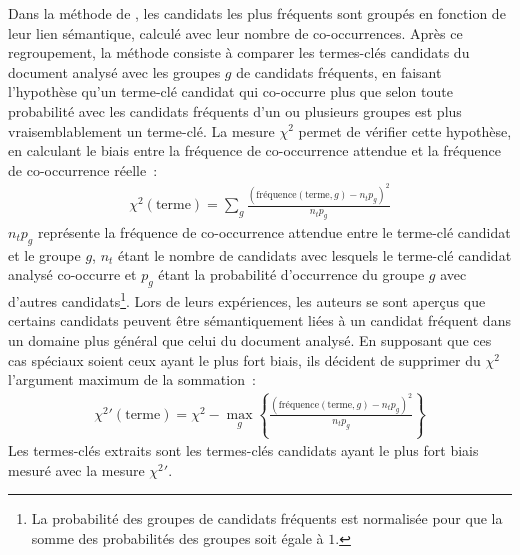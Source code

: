           Dans la méthode de , les candidats
          les plus fréquents sont groupés en fonction de leur lien sémantique,
          calculé avec leur nombre de co-occurrences. Après ce regroupement, la
          méthode consiste à comparer les termes-clés candidats du document
          analysé avec les groupes $g$ de candidats fréquents, en faisant
          l'hypothèse qu'un terme-clé candidat qui co-occurre plus que selon
          toute probabilité avec les candidats fréquents d'un ou plusieurs
          groupes est plus vraisemblablement un terme-clé. La mesure $\chi^2$
          permet de vérifier cette hypothèse, en calculant le biais entre la
          fréquence de co-occurrence attendue et la fréquence de co-occurrence
          réelle~:
          \begin{align}
            \chi^2(\text{terme}) = \sum_{g} \frac{(\text{fréquence}(\text{terme}, g) - n_tp_g)^2}{n_tp_g}
          \end{align}
          $n_tp_g$ représente la fréquence de co-occurrence attendue entre le
          terme-clé candidat et le groupe $g$, $n_t$ étant le nombre de
          candidats avec lesquels le terme-clé candidat analysé co-occurre et
          $p_g$ étant la probabilité d'occurrence du groupe $g$ avec d'autres
          candidats\footnote{La probabilité des groupes de candidats fréquents
          est normalisée pour que la somme des probabilités des groupes soit
          égale à $1$.}. Lors de leurs expériences, les auteurs se sont aperçus
          que certains candidats peuvent être sémantiquement liées à un
          candidat fréquent dans un domaine plus général que celui du document
          analysé. En supposant que ces cas spéciaux soient ceux ayant le plus
          fort biais, ils décident de supprimer du $\chi^2$ l'argument maximum
          de la sommation~:
          \begin{align}
            \chi^2{'}(\text{terme}) = \chi^2 - \max_{g}\left\{\frac{(\text{fréquence}(\text{terme}, g) - n_tp_g)^2}{n_tp_g}\right\}
          \end{align}
          Les termes-clés extraits sont les termes-clés candidats ayant le plus
          fort biais mesuré avec la mesure $\chi^2{'}$.

